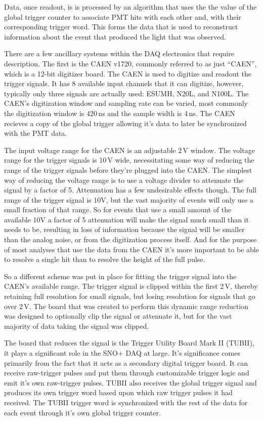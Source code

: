 Data, once readout, is is processed by an algorithm that uses the
the value of the global trigger counter to associate PMT hits with
each other and, with their corresponding trigger word. 
This forms the data that is used to reconstruct information
about the event that produced the light that was observed.

There are a few ancillary systems within the DAQ electronics
that require description. The first is the CAEN v1720, commonly
referred to as just ``CAEN'', which is a 12-bit digitizer board.
The CAEN is used to digitize and readout the trigger signals.
It has 8 available input channels that it can digitize, however,
typically only three signals are actually used: ESUMH, N20L, and
N100L. The CAEN's digitization window and sampling rate can be varied,
most commonly the digitization window is 420\,ns and the sample width
is 4\,ns. The CAEN recieves a copy of the global trigger allowing it's
data to later be synchronized with the PMT data.

The input voltage range for the CAEN is an adjustable 2\,V window.
The voltage range for the trigger signals is 10\,V wide,
necessitating some way of reducing the range of the trigger signals
before they're plugged into the CAEN.
The simplest way of reducing the voltage range is to use a voltage
divider to attenuate the signal by a factor of 5.
Attenuation has a few undesirable effects though.
The full range of the trigger signal is 10V, but the vast
majority of events will only use a small fraction of that range.
So for events that use a small amount of the available 10V a factor
of 5 attenuation will make the signal much small than it needs to be,
resulting in loss of information because the signal will be smaller than
the analog noise, or from the digitization process itself.
And for the purpose of most analyses that use the data from the CAEN
it's more important to be able to resolve a single hit than to resolve
the height of the full pulse.

So a different scheme was put in place for fitting the trigger signal
into the CAEN's available range. The trigger signal is clipped within
the first 2\,V, thereby retaining full resolution for small signals,
but losing resolution for signals that go over 2\,V.
The board that was created to perform this dynamic range reduction
was designed to optionally clip the signal or attenuate it, but
for the vast majority of data taking the signal was clipped.

The board that reduces the signal is the Trigger Utility Board Mark II (TUBII),
it plays a significant role in the SNO+ DAQ at large.
It's significance comes primarily from the fact that it acts as a secondary
digital trigger board. It can receive raw-trigger pulses and put them
through customizable trigger logic and emit it's own raw-trigger pulses.
TUBII also receives the global trigger signal and produces its own trigger
word based upon which raw trigger pulses it had received. The TUBII trigger
word is synchronized with the rest of the data for each event through it's own
global trigger counter.

